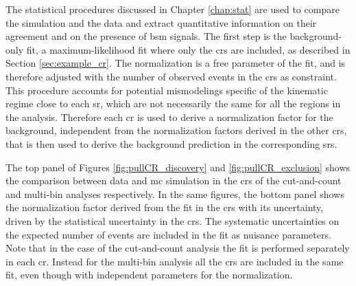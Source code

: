 The statistical procedures discussed in Chapter \ref{chap:stat} are used to compare the simulation and the data and extract 
quantitative information on their agreement and on the presence of \gls{bsm} signals. 
The first step is the background-only fit, a maximum-likelihood fit where only the \glspl{cr} are included, as described in Section 
\ref{sec:example_cr}. 
The \ttbar normalization is a free parameter of the fit, and is therefore adjusted with the number of observed events in the \glspl{cr} 
as constraint.
This procedure accounts for potential mismodelings specific of the kinematic regime close to each \gls{sr}, which are not necessarily 
the same for all the regions in the analysis. Therefore each \gls{cr} is used to derive a normalization factor for the \ttbar background,
independent from the normalization factors derived in the other \glspl{cr}, that is then used to derive the background prediction in the 
corresponding \glspl{sr}. 

The top panel of Figures \ref{fig:pullCR_discovery} and \ref{fig:pullCR_exclusion} shows the 
comparison between data and \gls{mc} simulation in the 
\glspl{cr} of the cut-and-count and multi-bin analyses respectively. In the same figures, the bottom panel 
shows the \ttbar normalization factor derived from the fit in the \glspl{cr} with its uncertainty, driven by the statistical uncertainty 
in the \glspl{cr}.  The systematic uncertainties on the expected number of events are included in the fit as nuisance parameters.
Note that in the case of the cut-and-count analysis the fit is performed separately in each \gls{cr}.
Instead for the multi-bin analysis all the \glspl{cr} are included in the same fit, even though with independent parameters for the 
\ttbar normalization. 
 

